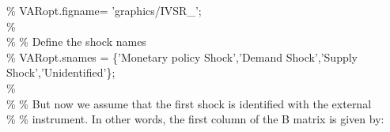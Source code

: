 \hspace{1mm}\hspace{5mm} \hspace{5mm} \hspace{5mm} \hspace{5mm} \textcolor{matlabgreen}{\% VARopt.figname= 'graphics/IVSR\_'; }\\ 
\hspace{1mm}\hspace{5mm} \hspace{5mm} \hspace{5mm} \hspace{5mm} \textcolor{matlabgreen}{\%  }\\ 
\hspace{1mm}\hspace{5mm} \hspace{5mm} \hspace{5mm} \hspace{5mm} \textcolor{matlabgreen}{\% }\textcolor{matlabgreen}{\% Define the shock names }\\ 
\hspace{1mm}\hspace{5mm} \hspace{5mm} \hspace{5mm} \hspace{5mm} \textcolor{matlabgreen}{\% VARopt.snames = \{'Monetary policy Shock','Demand Shock','Supply Shock','Unidentified'\}; }\\ 
\hspace{1mm}\hspace{5mm} \hspace{5mm} \hspace{5mm} \hspace{5mm} \textcolor{matlabgreen}{\%  }\\ 
\hspace{1mm}\hspace{5mm} \hspace{5mm} \hspace{5mm} \hspace{5mm} \textcolor{matlabgreen}{\% }\textcolor{matlabgreen}{\% But now we assume that the first shock is identified with the external  }\\ 
\hspace{1mm}\hspace{5mm} \hspace{5mm} \hspace{5mm} \hspace{5mm} \textcolor{matlabgreen}{\% }\textcolor{matlabgreen}{\% instrument. In other words, the first column of the B matrix is given by: }\\ 
